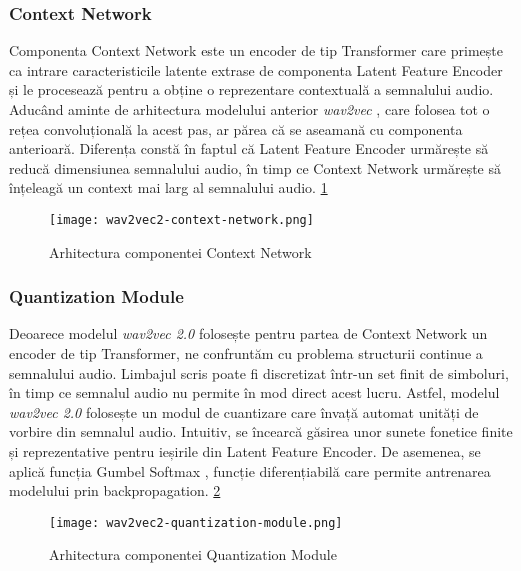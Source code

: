 \vspace{3em}

\subsubsection{Context Network}
\vspace{1em}
Componenta Context Network este un encoder de tip Transformer care primește ca
intrare caracteristicile latente extrase de componenta Latent Feature Encoder și
le procesează pentru a obține o reprezentare contextuală a semnalului audio. Aducând
aminte de arhitectura modelului anterior \textit{wav2vec} \cite{wav2vec}, care folosea
tot o rețea convoluțională la acest pas, ar părea că se aseamană cu componenta anterioară.
Diferența constă în faptul că Latent Feature Encoder urmărește să reducă dimensiunea 
semnalului audio, în timp ce Context Network urmărește să înțeleagă un context mai larg
al semnalului audio. \ref{fig:wav2vec2-context-network}

\begin{figure}[h]
    \centering
    \texttt{[image: wav2vec2-context-network.png]}
    \caption{Arhitectura componentei Context Network \protect\footnotemark[1]}
    \label{fig:wav2vec2-context-network}
\end{figure}

\vspace{3em}

\subsubsection{Quantization Module} 
Deoarece modelul \textit{wav2vec 2.0} folosește pentru partea de Context Network un encoder de tip
Transformer, ne confruntăm cu problema structurii continue a semnalului audio. Limbajul scris poate
fi discretizat într-un set finit de simboluri, în timp ce semnalul audio nu permite în mod direct
acest lucru. Astfel, modelul \textit{wav2vec 2.0} folosește un modul de cuantizare care învață automat
unități de vorbire din semnalul audio. Intuitiv, se încearcă găsirea unor sunete fonetice 
finite și reprezentative pentru ieșirile din Latent Feature Encoder. De asemenea, se aplică 
funcția Gumbel Softmax \cite{gumbel-softmax}, funcție diferențiabilă care permite antrenarea modelului
prin backpropagation. \ref{fig:wav2vec2-quantization-module}

\begin{figure}[h]
    \centering
    \texttt{[image: wav2vec2-quantization-module.png]}
    \caption{Arhitectura componentei Quantization Module \protect\footnotemark[1]}
    \label{fig:wav2vec2-quantization-module}
\end{figure}

